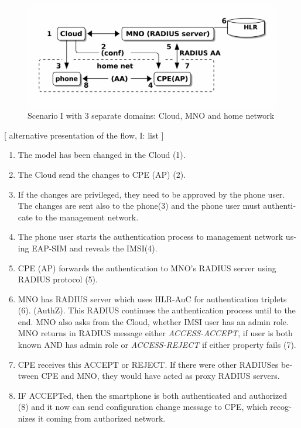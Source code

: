 \documentclass[12pt,a4paper,english]{tutthesis}
\begin{document}
\begin{otherlanguage}{english}
\begin{figure}[htb]
\centering
\includegraphics[width=.9\linewidth]{scenI.png}
\caption{\label{fig:scenario-I}Scenario I with 3 separate domains: Cloud, MNO and home network}
\end{figure}



[ alternative presentation of the flow, I: list ] 

\begin{enumerate}
\item The model has been changed in the Cloud (1).
\item The Cloud send the changes to CPE (AP) (2).
\item If the changes are privileged, they need to be approved by the phone user.
The changes are sent also to the phone(3) and the phone user must
authenticate to the management network.
\item The phone user starts the authentication process to management
network using EAP-SIM and reveals the IMSI(4).
\item CPE (AP) forwards the authentication to MNO's RADIUS server using
RADIUS protocol (5).
\item MNO has RADIUS server which uses HLR-AuC for authentication
  triplets (6). 
  (AuthZ). This RADIUS continues the authentication process until to
  the end. 
MNO also asks from the Cloud, whether IMSI user has an admin role.
MNO returns in RADIUS message either \emph{ACCESS-ACCEPT}, if user is both
  known AND has admin role  or \emph{ACCESS-REJECT} if either property
  fails (7).
\item CPE receives this ACCEPT or REJECT. If there were other RADIUSes
between CPE and MNO, they would have acted
as proxy RADIUS servers.
\item IF ACCEPTed, then the smartphone is both authenticated and
authorized (8) and it now 
can send configuration change message to CPE, which recognizes it
coming from authorized  network.
\end{enumerate}




\end{otherlanguage}
\end{document}
